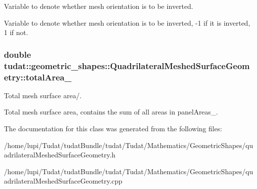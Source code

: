 Variable to denote whether mesh orientation is to be inverted. 

Variable to denote whether mesh orientation is to be inverted, -\/1 if it is inverted, 1 if not. 
\subsubsection[{\texorpdfstring{total\+Area\+\_\+}{totalArea_}}]{\setlength{\rightskip}{0pt plus 5cm}double tudat\+::geometric\+\_\+shapes\+::\+Quadrilateral\+Meshed\+Surface\+Geometry\+::total\+Area\+\_\+\hspace{0.3cm}{\ttfamily [protected]}}\hypertarget{classtudat_1_1geometric__shapes_1_1QuadrilateralMeshedSurfaceGeometry_a976236e69019a26244beecb29b650112}{}\label{classtudat_1_1geometric__shapes_1_1QuadrilateralMeshedSurfaceGeometry_a976236e69019a26244beecb29b650112}


Total mesh surface area/. 

Total mesh surface area, contains the sum of all areas in panel\+Areas\+\_\+. 

The documentation for this class was generated from the following files\+:\begin{DoxyCompactItemize}
\item 
/home/lupi/\+Tudat/tudat\+Bundle/tudat/\+Tudat/\+Mathematics/\+Geometric\+Shapes/quadrilateral\+Meshed\+Surface\+Geometry.\+h\item 
/home/lupi/\+Tudat/tudat\+Bundle/tudat/\+Tudat/\+Mathematics/\+Geometric\+Shapes/quadrilateral\+Meshed\+Surface\+Geometry.\+cpp\end{DoxyCompactItemize}
